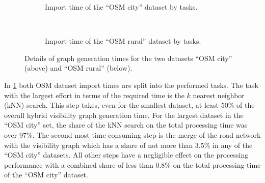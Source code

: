 		\begin{figure}[h!]
			\begin{figcenter}
				\begin{subfigure}[t]{\textwidth}
					\begin{figcenter}
						
					\end{figcenter}
					\caption{Import time of the \enquote{OSM city} dataset by tasks.}
				\end{subfigure}
%						
			\end{figcenter}
			\\
			\begin{figcenter}
				\begin{subfigure}[t]{\textwidth}
					\begin{figcenter}
						
					\end{figcenter}
					\caption{Import time of the \enquote{OSM rural} dataset by tasks.}
				\end{subfigure}
%						
			\end{figcenter}
			\caption{Details of graph generation times for the two datasets \enquote{OSM city} (above) and \enquote{OSM rural} (below).}
			\label{fig:eval-import-details}
		\end{figure}
		
		In \cref{fig:eval-import-details} both OSM dataset import times are split into the performed tasks.
		The task with the largest effort in terms of the required time is the $k$ nearest neighbor (kNN) search.
		This step takes, even for the smallest dataset, at least 50\% of the overall hybrid visibility graph generation time.
		For the largest dataset in the \enquote{OSM city} set, the share of the kNN search on the total processing time was over 97\%.
		The second most time consuming step is the merge of the road network with the visibility graph which has a share of not more than 3.5\% in any of the \enquote{OSM city} datasets.
		All other steps have a negligible effect on the processing performance with a combined share of less than 0.8\% on the total processing time of the \enquote{OSM city} dataset.
		
